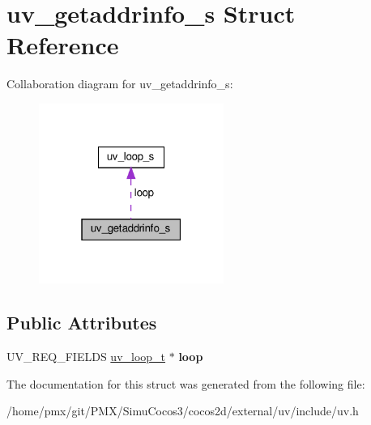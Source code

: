 \hypertarget{structuv__getaddrinfo__s}{}\section{uv\+\_\+getaddrinfo\+\_\+s Struct Reference}
\label{structuv__getaddrinfo__s}


Collaboration diagram for uv\+\_\+getaddrinfo\+\_\+s\+:
\nopagebreak
\begin{figure}[H]
\begin{center}
\leavevmode
\includegraphics[width=171pt]{structuv__getaddrinfo__s__coll__graph}
\end{center}
\end{figure}
\subsection*{Public Attributes}
\begin{DoxyCompactItemize}
\item 
\mbox{\label{structuv__getaddrinfo__s_a06945557ddda50095c21e2f290407ea9}} 
U\+V\+\_\+\+R\+E\+Q\+\_\+\+F\+I\+E\+L\+DS \hyperlink{structuv__loop__s}{uv\+\_\+loop\+\_\+t} $\ast$ {\bfseries loop}
\end{DoxyCompactItemize}


The documentation for this struct was generated from the following file\+:\begin{DoxyCompactItemize}
\item 
/home/pmx/git/\+P\+M\+X/\+Simu\+Cocos3/cocos2d/external/uv/include/uv.\+h\end{DoxyCompactItemize}
